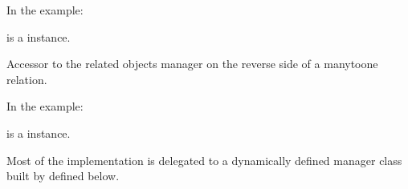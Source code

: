 \documentclass[letterpaper,10pt,english]{sphinxmanual}
\begin{document}
\begin{fulllineitems}
\begin{fulllineitems}
In the example:

\begin{sphinxVerbatim}[commandchars=\\\{\}]
 
       
\end{sphinxVerbatim}

 is a  instance.

\end{fulllineitems}


\begin{fulllineitems}
\label{\detokenize{masterCodeDoc:checklisten.models.Checkliste.amt_id}}
\end{fulllineitems}


\begin{fulllineitems}
\label{\detokenize{masterCodeDoc:checklisten.models.Checkliste.checklisteaufgabe_set}}
Accessor to the related objects manager on the reverse side of a
many\sphinxhyphen{}to\sphinxhyphen{}one relation.

In the example:

\begin{sphinxVerbatim}[commandchars=\\\{\}]
 
       
\end{sphinxVerbatim}

 is a  instance.

Most of the implementation is delegated to a dynamically defined manager
class built by  defined below.


\end{fulllineitems}
\end{fulllineitems}
\end{document}
